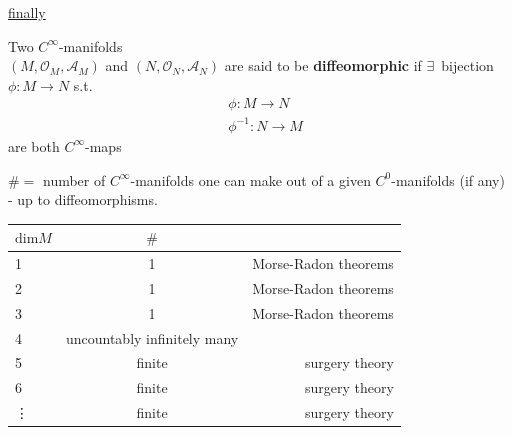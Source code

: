 \underline{finally}

\begin{definition}
	Two $C^{\infty}$-manifolds \\
	$(M,\mathcal{O}_M, \mathcal{A}_M)$ and $(N,\mathcal{O}_N, \mathcal{A}_N)$ are said to be \textbf{diffeomorphic} if $\exists \, $ bijection $\phi : M \to N$ s.t. 
	\[
	\begin{aligned} & \phi : M \to N \\
	& \phi^{-1} : N \to M \end{aligned}
	\]
	are both $C^{\infty}$-maps
	
	
	
	\end{definition}
	
	\begin{theorem}
	$\# = $ number of $C^{\infty}$-manifolds one can make out of a given $C^0$-manifolds (if any) - up to diffeomorphisms.  
	
	\begin{tabular}{l | c r }
	$\text{dim}M$ &  $\#$ &  \\
	\hline
	1  & 1  & Morse-Radon theorems \\
	2  & 1  & Morse-Radon theorems \\
	3 & 1  & Morse-Radon theorems \\
	4 & uncountably infinitely many & \\
	5 &   finite  & surgery theory \\
	6 &  finite & surgery theory \\
	\vdots & finite & surgery theory
	\end{tabular}
	
	\end{theorem}
	
